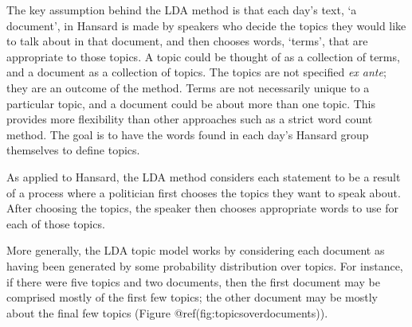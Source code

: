 \documentclass[12pt,]{article}
\begin{document}
The key assumption behind the LDA method is that each day's text, `a
document', in Hansard is made by speakers who decide the topics they
would like to talk about in that document, and then chooses words,
`terms', that are appropriate to those topics. A topic could be thought
of as a collection of terms, and a document as a collection of topics.
The topics are not specified \emph{ex ante}; they are an outcome of the
method. Terms are not necessarily unique to a particular topic, and a
document could be about more than one topic. This provides more
flexibility than other approaches such as a strict word count method.
The goal is to have the words found in each day's Hansard group
themselves to define topics.

As applied to Hansard, the LDA method considers each statement to be a
result of a process where a politician first chooses the topics they
want to speak about. After choosing the topics, the speaker then chooses
appropriate words to use for each of those topics.

More generally, the LDA topic model works by considering each document
as having been generated by some probability distribution over topics.
For instance, if there were five topics and two documents, then the
first document may be comprised mostly of the first few topics; the
other document may be mostly about the final few topics (Figure
@ref(fig:topicsoverdocuments)).
\end{document}
